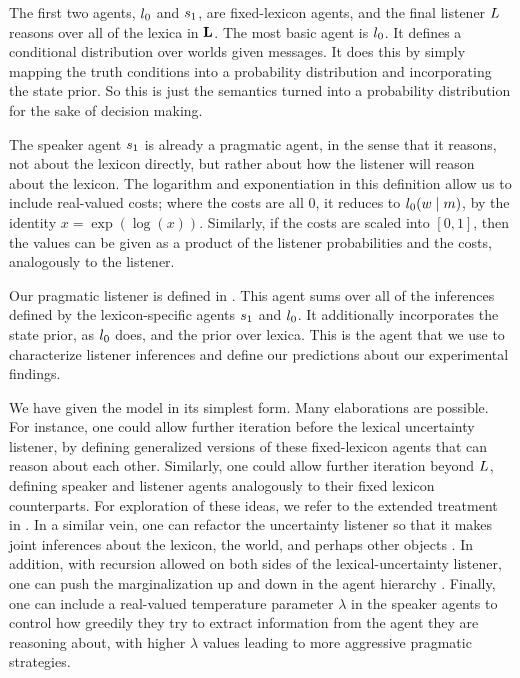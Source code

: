 \documentclass[leqno]{article}
\begin{document}
The first two agents, $l_{0}$ and $s_{1}$, are
fixed-lexicon agents, and the final listener $L$
reasons over all of the lexica in $\mathbf{L}$.  The most basic agent is
$l_{0}$. It defines a conditional distribution over worlds
given messages. It does this by simply mapping the truth conditions
into a probability distribution and incorporating the state prior. So
this is just the semantics turned into a probability distribution for
the sake of decision making.

The speaker agent $s_{1}$ is already a pragmatic agent, in the
sense that it reasons, not about the lexicon directly, but rather
about how the listener will reason about the lexicon. The logarithm
and exponentiation in this definition allow us to include real-valued
costs; where the costs are all $0$, it reduces to
$l_{0}(w \mid m)$, by the identity $x =
\exp(\log(x))$.  Similarly, if the costs are scaled into $[0,1]$, then
the values can be given as a product of the listener probabilities and
the costs, analogously to the listener.

Our pragmatic listener is defined in . This agent
sums over all of the inferences defined by the lexicon-specific agents
$s_{1}$ and $l_{0}$. It additionally incorporates the
state prior, as $l_{0}$ does, and the prior over lexica.  This
is the agent that we use to characterize listener inferences and
define our predictions about our experimental findings.

We have given the model in its simplest form. Many elaborations are
possible. For instance, one could allow further iteration before the
lexical uncertainty listener, by defining generalized versions of
these fixed-lexicon agents that can reason about each
other. Similarly, one could allow further iteration beyond
$L$, defining speaker and listener agents
analogously to their fixed lexicon counterparts.  For exploration of
these ideas, we refer to the extended treatment in
\citealt{Bergen:Levy:Goodman:2014}. In a similar vein, one can
refactor the uncertainty listener so that it makes joint inferences
about the lexicon, the world, and perhaps other objects
\citep{Smith:Goodman:Frank:2013, Kao-etal:2014}. In addition, with
recursion allowed on both sides of the lexical-uncertainty listener,
one can push the marginalization up and down in the agent hierarchy
\citep{Goodman:Lassiter:2013}. Finally, one can include a real-valued
temperature parameter $\lambda$ in the speaker agents to control how
greedily they try to extract information from the agent they are
reasoning about, with higher $\lambda$ values leading to more
aggressive pragmatic strategies.
\end{document}

